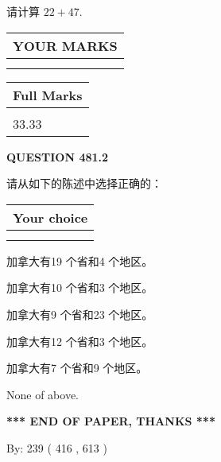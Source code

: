 \documentclass{ctexart}
\begin{document}
  
 
请计算 $ %
22 +  %
47 $.
 

 

 
  
\vspace{0.2in}
  
\noindent\begin{tabular}{|l|}
\hline
 YOUR MARKS  \\
\hline
 \\ 
 \\ 
\hline
\end{tabular}
\hspace{0.05in} \begin{tabular}{|l|}
\hline
 Full Marks  \\
\hline
 \\ 
33.33 \\
\hline
\end{tabular}
{\textbf{\Large{QUESTION
481.2 
}}}
  
  
请从如下的陈述中选择正确的：
  
  
\noindent\hspace{3.0in} \begin{tabular}{|l|}
\hline
Your choice \\
\hline
 \\ 
 \\ 
\hline
\end{tabular}
  
  
 
 
加拿大有19 个省和4 个地区。
 
 
加拿大有10 个省和3 个地区。
 
 
加拿大有9 个省和23 个地区。
 
 
加拿大有12 个省和3 个地区。
 
 
加拿大有7 个省和9 个地区。
 
 
 None of above.
 
 
   
   
 \vspace{0.2in}
 
   
   
   
   
\vspace{1.0in} 
{\textbf{\large{ *** END OF PAPER, THANKS *** }}} 
   
   
\hspace{1.0in} By: 
 239 ( 416 ,  613 )
   
\end{document}
